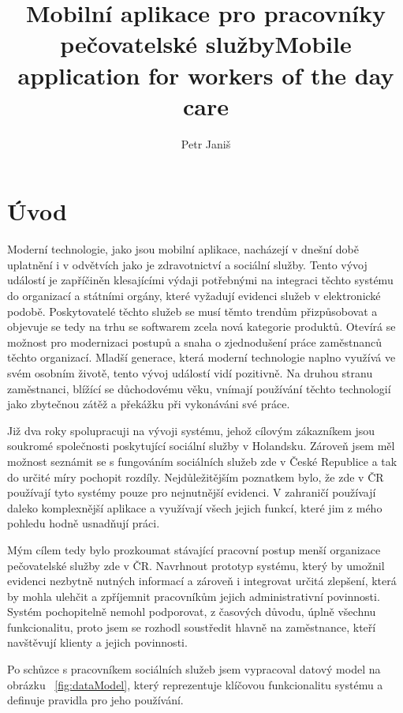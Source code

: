 \documentclass[
  biblatex,
  glossaries,
  index
]{kidiplom}
\title{Mobilní aplikace pro pracovníky pečovatelské služby}
\title[english]{Mobile application for workers of the day care}
\author{Petr Janiš}
\begin{document}
\maketitle

\section{Úvod}
Moderní technologie, jako jsou mobilní aplikace, nacházejí v dnešní době uplatnění i v odvětvích jako je zdravotnictví a sociální služby. Tento vývoj událostí je zapříčiněn klesajícími výdaji potřebnými na integraci těchto systému do organizací a státními orgány, které vyžadují evidenci služeb v elektronické podobě. Poskytovatelé těchto služeb se musí těmto trendům přizpůsobovat a objevuje se tedy na trhu se softwarem zcela nová kategorie produktů. Otevírá se možnost pro modernizaci postupů a snaha o zjednodušení práce zaměstnanců těchto organizací. Mladší generace, která moderní technologie naplno využívá ve svém osobním životě, tento vývoj událostí vidí pozitivně. Na druhou stranu zaměstnanci, blížící se důchodovému věku, vnímají používání těchto technologií jako zbytečnou zátěž a překážku při vykonáváni své práce.

Již dva roky spolupracuji na vývoji systému, jehož cílovým zákazníkem jsou soukromé společnosti poskytující sociální služby v Holandsku. Zároveň jsem měl možnost seznámit se s fungováním sociálních služeb zde v České Republice a tak do určité míry pochopit rozdíly. Nejdůležitějším poznatkem bylo, že zde v ČR  používají tyto systémy pouze pro nejnutnější evidenci. V zahraničí používají daleko komplexnější aplikace a využívají všech jejich funkcí, které jim z mého pohledu hodně usnadňují práci. 

Mým cílem tedy bylo prozkoumat stávající pracovní postup menší organizace pečovatelské služby zde v ČR. Navrhnout prototyp systému, který by umožnil evidenci nezbytně nutných informací a zároveň i integrovat určitá zlepšení, která by mohla ulehčit a zpříjemnit pracovníkům jejich administrativní povinnosti. Systém pochopitelně nemohl podporovat, z časových důvodu, úplně všechnu funkcionalitu, proto jsem se rozhodl soustředit hlavně na zaměstnance, kteří navštěvují klienty a jejich povinnosti. 

Po schůzce s pracovníkem sociálních služeb jsem vypracoval datový model na obrázku ~\ref{fig:dataModel}, který reprezentuje klíčovou funkcionalitu systému a definuje pravidla pro jeho používání.
\end{document}
